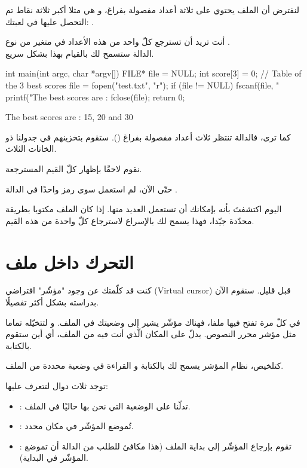 لنفترض أن الملف يحتوي على ثلاثة أعداد مفصولة بفراغ، و هي مثلا أكبر ثلاثة نقاط تم التحصل عليها في لعبتك:
.

أنت تريد أن تسترجع كلّ واحد من هذه الأعداد في متغير من نوع
.\\
الدالة
ستسمح لك بالقيام بهذا بشكل سريع.

\begin{Csource}
int main(int argc, char *argv[])
{
  FILE* file = NULL;
  int score[3] = {0}; // Table of the 3 best scores
  file = fopen("test.txt", "r");
  if (file != NULL)
  {
    fscanf(file, "%
    printf("The best scores are : %
    fclose(file);
  }
  return 0;
}
\end{Csource}

\begin{Console}
The best scores are : 15, 20 and 30
\end{Console}

كما ترى، فالدالة
تنتظر ثلاث أعداد مفصولة بفراغ
().
ستقوم بتخزينهم في جدولنا ذو الخانات الثلاث.

نقوم لاحقًا بإظهار كلّ القيم المسترجعة.

\begin{information}
حتّى الآن، لم استعمل سوى رمز
واحدًا في الدالة
.

اليوم اكتشفتَ بأنه بإمكانك أن تستعمل العديد منها. إذا كان الملف مكتوبا بطريقة محدّدة جيّدا، فهذا يسمح لك بالإسراع لاسترجاع كلّ واحدة من هذه القيم.
\end{information}

\section{التحرك داخل ملف}

كنت قد كلّمتك عن وجود "مؤشّر" افتراضي
(\textenglish{Virtual cursor})
قبل قليل.
سنقوم الآن بدراسته بشكل أكثر تفصيلًا.

في كلّ مرة تفتح فيها ملفا، فهناك مؤشّر يشير إلى وضعيتك في الملف. و لتتخيّله تماما مثل مؤشر محرر النصوص. يدلّ على المكان الّذي أنت فيه من الملف، أي أين ستقوم بالكتابة.

كتلخيص، نظام المؤشر يسمح لك بالكتابة و القراءة في وضعية محددة من الملف.

توجد ثلاث دوال لتتعرف عليها:

\begin{itemize}
  \item {}:
  تدلّنا على الوضعية التي نحن بها حاليًا في الملف.
  \item {}:
  تُموضع المؤشّر في مكان محدد.
  \item {}:
  تقوم بإرجاع المؤشّر إلى بداية الملف (هذا مكافئ للطلب من الدالة
  أن تموضع المؤشّر في البداية).
\end{itemize}

